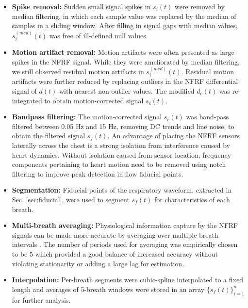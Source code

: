 \documentclass[journal]{IEEEtran}
\begin{document}
\begin{itemize}
    \item \textbf{Spike removal:} Sudden small signal spikes in $s_{i}(t)$ were removed by median filtering, in which each sample value was replaced by the median of samples in a sliding window. After filling in signal gaps with median values, $s_{i}^{(med)}(t)$ was free of ill-defined null values. 
    \item \textbf{Motion artifact removal:} Motion artifacts were often presented as large spikes in the NFRF signal. While they were ameliorated by median filtering, we still observed residual motion artifacts in $s_{i}^{(med)}(t)$. Residual motion artifacts were further reduced by replacing outliers in the NFRF differential signal of $d(t)$ with nearest non-outlier values. The modified $d_{c}(t)$ was re-integrated to obtain motion-corrected signal $s_{c}(t)$.
    \item \textbf{Bandpass filtering:} The motion-corrected signal $s_{c}(t)$ was band-pass filtered between 0.05 Hz and 15 Hz, removing DC trends and line noise, to obtain the filtered signal $s_f (t)$. An advantage of placing the NFRF sensors laterally across the chest is a strong isolation from interference caused by heart dynamics. Without isolation caused from sensor location, frequency components pertaining to heart motion need to be removed using notch filtering to improve peak detection in flow fiducial points. 
    \item \textbf{Segmentation:} Fiducial points of the respiratory waveform, extracted in Sec. \ref{sec:fiducial}, were used to segment $s_f (t)$ for characteristics of each breath.   
    \item \textbf{Multi-breath averaging:} Physiological information capture by the NFRF signals can be made more accurate by averaging over multiple breath intervals \cite{conroyHeartIDBiometric2023}. The number of periods used for averaging was empirically chosen to be 5 which provided a good balance of increased accuracy without violating stationarity or adding a large lag for estimation. 
    \item \textbf{Interpolation:} Per-breath segments were cubic-spline interpolated to a fixed length and averages of 5-breath windows were stored in an array $\{s_f (t)\}_{i=1}^{n}$ for further analysis.
\end{itemize} 
\end{document}
